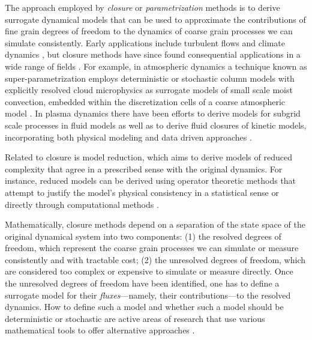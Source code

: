 \documentclass[letterpaper,10pt,3p,preprint]{elsarticle}
\begin{document}
The approach employed by \emph{closure} or \emph{parametrization}
methods is to derive surrogate dynamical models that can be used
to approximate the contributions of fine grain degrees of freedom
to the dynamics of coarse grain processes we can simulate
consistently.
Early applications include turbulent flows and climate dynamics
\cite{Tennekes1972,Arakawa1974,Gent1989,Sagaut2006},
but closure methods have since found consequential applications
in a wide range of fields
\cite{WE2007}.
For example, in atmospheric dynamics a technique known as
super-parametrization employs deterministic or stochastic column
models with explicitly resolved cloud microphysics as surrogate
models of small scale moist convection, embedded within the
discretization cells of a coarse atmospheric model
\cite{Grabowski1999,Grooms2013}.
In plasma dynamics there have been efforts to derive models
for subgrid scale processes in fluid models
as well as to derive fluid closures of kinetic models,
incorporating both physical modeling and data driven approaches
\cite{Hammett1990,Joseph2016,JYJi2018,ChMa2020,Wang2020,
Matthews2021,Laperre2022,Shukla2022}.

Related to closure is model reduction, which aims
to derive models of reduced complexity that agree in a prescribed
sense with the original dynamics.
For instance, reduced models can be derived using operator theoretic
methods that attempt to justify the model's physical consistency in a
statistical sense
\cite{Grabert1982,Chorin2000,Chorin2002,Parish2017,KLin2021}
or directly through computational methods
\cite{Hinze2005,Chaturantabut2010,Carlberg2013,Benner2015,
Patera2017,Raissi2019,Bhattacharya2021,Lauzon2024}.

Mathematically, closure methods depend on a separation of the
state space of the original dynamical system into two
components: (1) the resolved degrees of freedom, which represent
the coarse grain processes we can simulate or measure consistently
and with tractable cost;
(2) the unresolved degrees of freedom, which are considered too
complex or expensive to simulate or measure directly.
Once the unresolved degrees of freedom have been identified,
one has to define a surrogate model for their
\emph{fluxes}---namely, their contributions---to the
resolved dynamics.
How to define such a model and whether such a model should
be deterministic or stochastic are active areas of research
that use various mathematical tools to offer alternative
approaches
\cite{Majda2005,Pavliotis2008,WE2011,Berner2017,Ahmed2021}.
\end{document}

